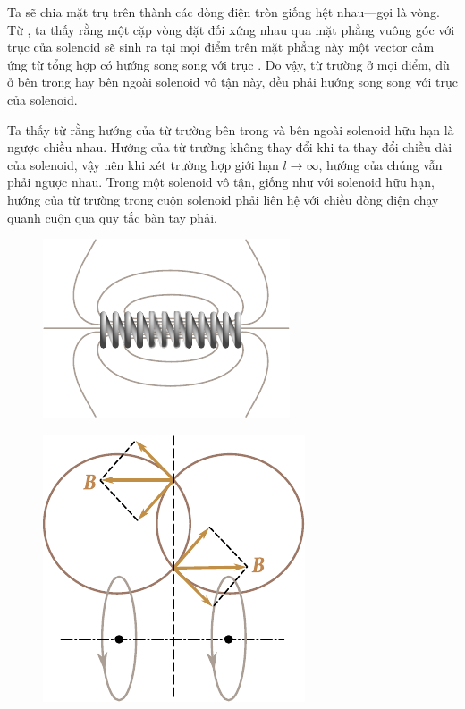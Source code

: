 \noindent
Ta sẽ chia mặt trụ trên thành các dòng điện tròn giống hệt nhau---gọi là vòng. Từ , ta thấy rằng một cặp vòng đặt đối xứng nhau qua mặt phẳng vuông góc với trục của solenoid sẽ sinh ra tại mọi điểm trên mặt phẳng này một vector cảm ứng từ tổng hợp có hướng song song với trục . Do vậy, từ trường ở mọi điểm, dù ở bên trong hay bên ngoài solenoid vô tận này, đều phải hướng song song với trục của solenoid.

Ta thấy từ  rằng hướng của từ trường bên trong và bên ngoài solenoid hữu hạn là ngược chiều nhau. Hướng của từ trường không thay đổi khi ta thay đổi chiều dài của solenoid, vậy nên khi xét trường hợp giới hạn $l\to\infty$, hướng của chúng vẫn phải ngược nhau. Trong một solenoid vô tận, giống như với solenoid hữu hạn, hướng của từ trường trong cuộn solenoid phải liên hệ với chiều dòng điện chạy quanh cuộn qua quy tắc bàn tay phải.

\begin{figure}[t]
	\begin{minipage}[t]{0.48\linewidth}
		\begin{center}
			\includegraphics[scale=1]{figures/ch_06/fig_6_27b.pdf}
			\caption[]{}
			\label{fig:6_27}
		\end{center}
	\end{minipage}
	\hfill{ }%
	\begin{minipage}[t]{0.48\linewidth}
		\begin{center}
			\includegraphics[scale=1]{figures/ch_06/fig_6_28.pdf}
			\caption[]{}
			\label{fig:6_28}
		\end{center}
	\end{minipage}
\vspace{-0.4cm}
\end{figure}

